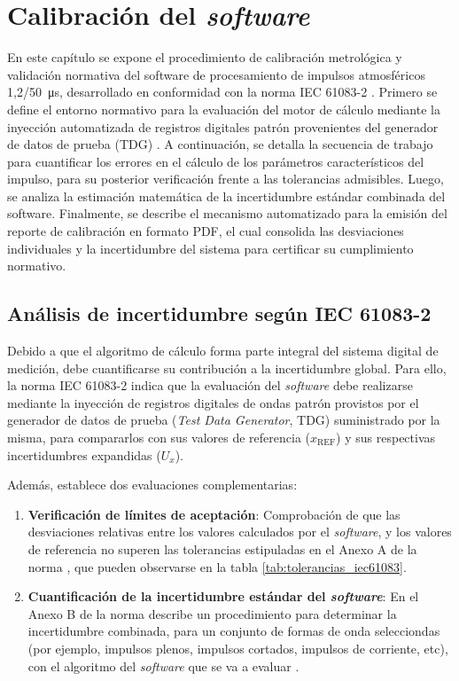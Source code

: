 \newpage
\chapter{Calibración del \emph{software}}
\label{ch:calibracion_software}
\vspace{3\baselineskip}

En este capítulo se expone el procedimiento de calibración metrológica y validación normativa del software de procesamiento de impulsos atmosféricos \qty[parse-numbers=false]{1,2/50}{\micro\second}, desarrollado en conformidad con la norma IEC 61083-2 \cite{iec61083_2}. Primero se define el entorno normativo para la evaluación del motor de cálculo mediante la inyección automatizada de registros digitales patrón provenientes del generador de datos de prueba (TDG) \cite{iec61083_2}. A continuación, se detalla la secuencia de trabajo para cuantificar los errores en el cálculo de los parámetros característicos del impulso, para su posterior verificación frente a las tolerancias admisibles. Luego, se analiza la estimación matemática de la incertidumbre estándar combinada del software. Finalmente, se describe el mecanismo automatizado para la emisión del reporte de calibración en formato PDF, el cual consolida las desviaciones individuales y la incertidumbre del sistema para certificar su cumplimiento normativo.

\section{Análisis de incertidumbre según IEC 61083-2}
\label{subsec:analisis_incertidumbre_iec61083_2}

Debido a que el algoritmo de cálculo forma parte integral del sistema digital de medición, debe cuantificarse su contribución a la incertidumbre global. Para ello, la norma IEC 61083-2 \cite{iec61083_2} indica que la evaluación del \emph{software} debe realizarse mediante la inyección de registros digitales de ondas patrón provistos por el generador de datos de prueba (\emph{Test Data Generator}, TDG) suministrado por la misma, para compararlos con sus valores de referencia ($x_{\text{REF}}$) y sus respectivas incertidumbres expandidas ($U_x$).

Además, establece dos evaluaciones complementarias:

\begin{enumerate}
    \item \textbf{Verificación de límites de aceptación}: Comprobación de que las desviaciones relativas entre los valores calculados por el \emph{software}, y los valores de referencia no superen las tolerancias estipuladas en el Anexo A de la norma \cite{iec61083_2}, que pueden observarse en la tabla \ref{tab:tolerancias_iec61083}.
    \item \textbf{Cuantificación de la incertidumbre estándar del \emph{software}}: En el Anexo B de la norma \cite{iec61083_2} describe un procedimiento para determinar la incertidumbre combinada, para un conjunto de formas de onda selecciondas (por ejemplo, impulsos plenos, impulsos cortados, impulsos de corriente, etc), con el algoritmo del \emph{software} que se va a evaluar .
\end{enumerate}


